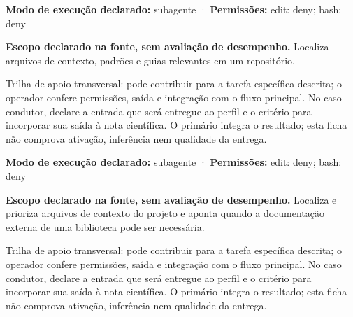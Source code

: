 \begin{arquitetura}
\textbf{Modo de execução declarado:} subagente · \textbf{Permissões:} edit: deny; bash: deny
\end{arquitetura}


\begin{descricao}
\textbf{Escopo declarado na fonte, sem avaliação de desempenho.}
Localiza arquivos de contexto, padrões e guias relevantes em um repositório.
\end{descricao}

\begin{funcao}
Trilha de apoio transversal: pode contribuir para a tarefa específica descrita; o operador confere permissões, saída e integração com o fluxo principal. No caso condutor, declare a entrada que será entregue ao perfil e o critério para incorporar sua saída à nota científica. O primário integra o resultado; esta ficha não comprova ativação, inferência nem qualidade da entrega.
\end{funcao}

\begin{arquitetura}
\textbf{Modo de execução declarado:} subagente · \textbf{Permissões:} edit: deny; bash: deny
\end{arquitetura}


\begin{descricao}
\textbf{Escopo declarado na fonte, sem avaliação de desempenho.}
Localiza e prioriza arquivos de contexto do projeto e aponta quando a documentação externa de uma biblioteca pode ser necessária.
\end{descricao}

\begin{funcao}
Trilha de apoio transversal: pode contribuir para a tarefa específica descrita; o operador confere permissões, saída e integração com o fluxo principal. No caso condutor, declare a entrada que será entregue ao perfil e o critério para incorporar sua saída à nota científica. O primário integra o resultado; esta ficha não comprova ativação, inferência nem qualidade da entrega.
\end{funcao}

